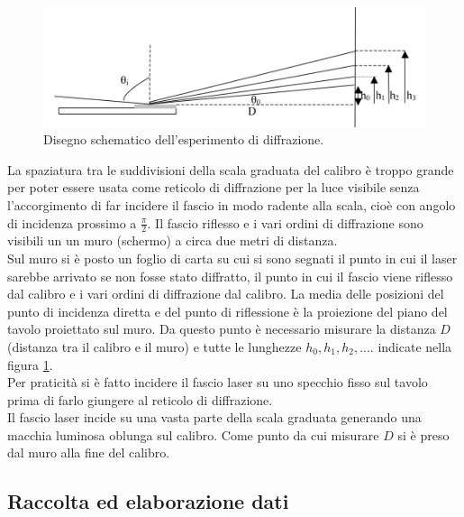 \documentclass[10pt,a4paper]{article}
\begin{document}
\begin{figure}[!htb]
  \centering
  \includegraphics[scale=.5]{disegno1.png}
\caption{Disegno schematico dell'esperimento di diffrazione.}
\label{parteAfigura}

\end{figure}
La spaziatura tra le suddivisioni della scala graduata del calibro è troppo grande per poter essere usata come reticolo di diffrazione per la luce visibile senza l'accorgimento di far incidere il fascio in modo radente alla scala, cioè con angolo di incidenza prossimo a $\frac{\pi}{2}$. Il fascio riflesso e i vari ordini di diffrazione sono visibili un un muro (schermo) a circa due metri di distanza.\\
Sul muro si è posto un foglio di carta su cui si sono segnati il punto in cui il laser sarebbe arrivato se non fosse stato diffratto, il punto in cui il fascio viene riflesso dal calibro e i vari ordini di diffrazione dal calibro. La media delle posizioni del punto di incidenza diretta e del punto di riflessione è la proiezione del piano del tavolo proiettato sul muro. Da questo punto è necessario misurare la distanza $D$ (distanza tra il calibro e il muro) e tutte le lunghezze $h_0, h_1, h_2,...$. indicate nella figura \ref{parteAfigura}.\\
Per praticità si è fatto incidere il fascio laser su uno specchio fisso sul tavolo prima di farlo giungere al reticolo di diffrazione.\\ 
Il fascio laser incide su una vasta parte della scala graduata generando una macchia luminosa oblunga sul calibro. Come punto da cui misurare $D$ si è preso dal muro alla fine del calibro.\\


\subsection{Raccolta ed elaborazione dati}
\end{document}

